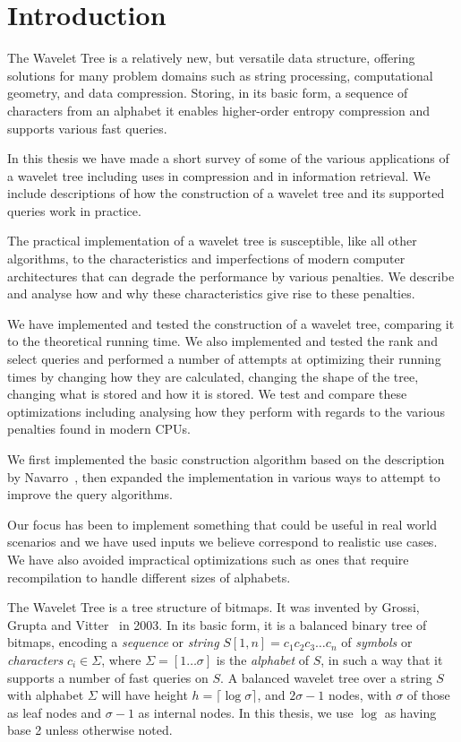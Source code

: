 \section{Introduction}
The Wavelet Tree is a relatively new, but versatile data structure, offering solutions for many problem domains such as string processing, computational geometry, and data compression.
Storing, in its basic form, a sequence of characters from an alphabet it enables higher-order entropy compression and supports various fast queries.

In this thesis we have made a short survey of some of the various applications of a wavelet tree including uses in compression and in information retrieval.
We include descriptions of how the construction of a wavelet tree and its supported queries work in practice.

The practical implementation of a wavelet tree is susceptible, like all other algorithms, to the characteristics and imperfections of modern computer architectures that can degrade the performance by various penalties.
We describe and analyse how and why these characteristics give rise to these penalties.

We have implemented and tested the construction of a wavelet tree, comparing it to the theoretical running time.
We also implemented and tested the rank and select queries and performed a number of attempts at optimizing their running times by changing how they are calculated, changing the shape of the tree, changing what is stored and how it is stored.
We test and compare these optimizations including analysing how they perform with regards to the various penalties found in modern CPUs.

We first implemented the basic construction algorithm based on the description by Navarro~, then expanded the implementation in various ways to attempt to improve the query algorithms.

Our focus has been to implement something that could be useful in real world scenarios and we have used inputs we believe correspond to realistic use cases.
We have also avoided impractical optimizations such as ones that require recompilation to handle different sizes of alphabets.

The Wavelet Tree is a tree structure of bitmaps.
It was invented by Grossi, Grupta and Vitter~ in 2003.
In its basic form, it is a balanced binary tree of bitmaps, encoding a \textit{sequence} or \textit{string} $S[1,n] = c_1c_2c_3 \ldots c_n$ of \textit{symbols} or \textit{characters} $c_i \in \Sigma$, where $\Sigma = [1 \ldots \sigma]$ is the \textit{alphabet} of $S$, in such a way that it supports a number of fast queries on $S$.
A balanced wavelet tree over a string $S$ with alphabet $\Sigma$ will have height $h = \lceil \log \sigma \rceil$, and $2 \sigma - 1$ nodes, with $\sigma$ of those as leaf nodes and $\sigma - 1$ as internal nodes.
In this thesis, we use $\log$ as having base 2 unless otherwise noted.

